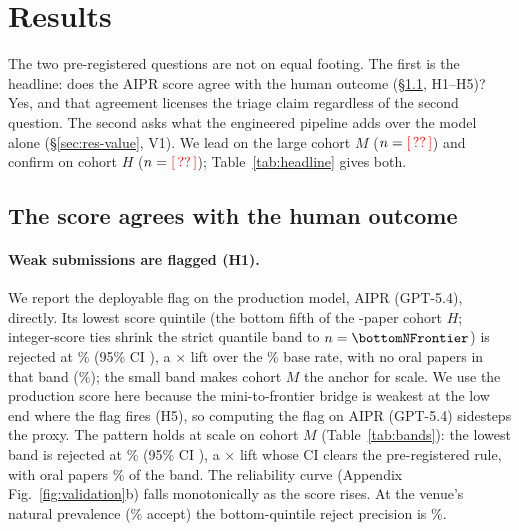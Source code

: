 \section{Results}
\label{sec:results}

The two pre-registered questions are not on equal footing. The first is the headline:
does the AIPR score agree with the human outcome (\S\ref{sec:res-validity}, H1--H5)?
Yes, and that agreement licenses the triage claim regardless of the second question. The
second asks what the engineered pipeline adds over the model alone
(\S\ref{sec:res-value}, V1). We lead on the large cohort $M$ ($n=\textcolor{red}{[\,??\,]}$) and
confirm on cohort $H$ ($n=\textcolor{red}{[\,??\,]}$); Table~\ref{tab:headline} gives both.

\subsection{The score agrees with the human outcome}
\label{sec:res-validity}

\begin{table}[t]
  \centering
  \caption{Headline metrics on the primary venue, for AIPR (GPT-5.4-mini) (statistical
  power) and AIPR (GPT-5.4) (production). Brackets are 95\% bootstrap confidence
  intervals.}
  \label{tab:headline}
  
\end{table}

\paragraph{Weak submissions are flagged (H1).}
We report the deployable flag on the production model, AIPR (GPT-5.4), directly. Its
lowest score quintile (the bottom fifth of the \NfullPrimary{}-paper cohort $H$;
integer-score ties shrink the strict quantile band to $n=\bottomNFrontier$) is rejected
at \bottomRejectRateFrontier\% (95\% CI \bottomRejectCIFrontier),
a \bottomLiftFrontier$\times$ lift over the \baseRejectRate\% base rate, with no oral
papers in that band (\bottomOralRateFrontier\%); the small band makes cohort $M$ the
anchor for scale. We use the
production score here because the mini-to-frontier bridge is weakest at the low end where
the flag fires (H5), so computing the flag on AIPR (GPT-5.4) sidesteps the proxy. The
pattern holds at scale on cohort $M$ (Table~\ref{tab:bands}): the lowest band is rejected
at \bottomRejectRate\% (95\% CI \bottomRejectCI), a \bottomLift$\times$ lift whose CI
\bottomLiftCI{} clears the pre-registered rule, with oral papers \bottomOralRate\% of the
band. The reliability curve (Appendix Fig.~\ref{fig:validation}b) falls monotonically as
the score rises. At the venue's natural prevalence (\natAcceptRate\% accept) the
bottom-quintile reject precision is \natBottomPrecision\%.

